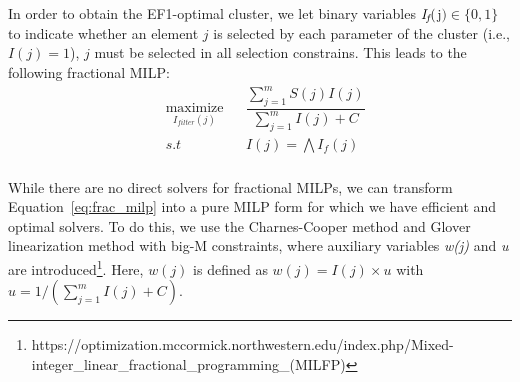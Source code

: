 In order to obtain the EF1-optimal cluster, we let binary variables $\emph{I\textsubscript{f}}($j$) \in \{0, 1\}$ to indicate whether an element $j$ is selected by each parameter of the cluster (i.e., $I(j)=1$), $j$ must be selected in all selection constrains.  This leads to the following fractional MILP:
\begin{equation}
\begin{aligned}
& \underset{I_{\mathit{filter}}(j)}{\text{maximize}}
& & \dfrac{\sum_{j=1}^m S(j)I(j)}{\sum_{j=1}^m I(j) + C} \\
& s.t
& & I(j) = \bigwedge I_{\mathit{f}}(j) \\
\end{aligned} \label{eq:frac_milp}
\end{equation}


While there are no direct solvers for fractional MILPs, we can transform Equation~\eqref{eq:frac_milp} into a pure MILP form for which we have efficient and optimal solvers.  To do this, we use the Charnes-Cooper method \cite{Charnes1962} and Glover linearization method \cite{Glover1975} with big-M constraints, where auxiliary variables \emph{w(j)} and \emph{u} are  introduced\footnote{https://optimization.mccormick.northwestern.edu/index.php/Mixed-integer\_linear\_fractional\_programming\_(MILFP)}. Here, $w(j)$ is defined as $w(j)=I(j)\times u$ with $u = 1 / (\sum_{j=1}^m I(j) + C)$.

